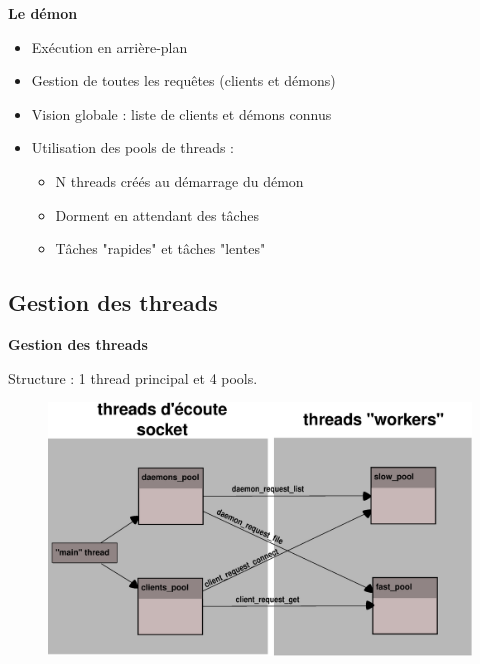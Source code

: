 \documentclass{beamer}
\begin{document}
\begin{frame}
    \textbf{Le démon}
    \begin{itemize}
        \item Exécution en arrière-plan
        \item Gestion de toutes les requêtes (clients et démons)
        \item Vision globale : liste de clients et démons connus
        \item Utilisation des pools de threads :
            \begin{itemize}
                \item N threads créés au démarrage du démon
                \item Dorment en attendant des tâches
                \item Tâches "rapides" et tâches "lentes"
            \end{itemize}
     \end{itemize}
\end{frame}


\begin{frame}
    \section{Gestion des threads}

    \textbf{Gestion des threads}

    Structure : 1 thread principal et 4 pools.
\begin{center}
\begin{figure}[htbp]
    \centering
    \includegraphics[scale=0.4]{pools_interacting.eps}
\end{figure}
\end{center}

\end{frame}
\end{document}
